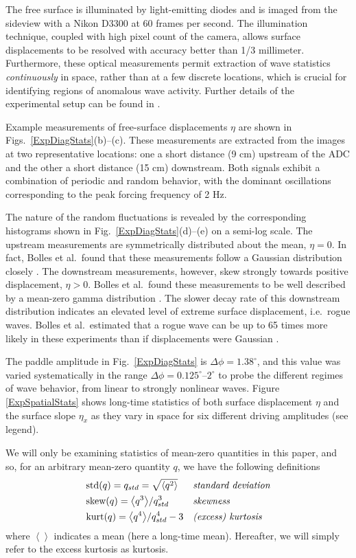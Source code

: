 \documentclass[11pt]{article}
\newcommand{\mean}[1]{\left< #1 \right>}
\newcommand{\skw}{\text{skew}}
\newcommand{\var}{\text{var}}
\newcommand{\kurt}{\text{kurt}}
\newcommand{\std}{\text{std}}
\newcommand{\Dphi}{\Delta \phi}
\begin{document}
	The free surface is illuminated by light-emitting diodes and is imaged from the sideview with a Nikon D3300 at 60 frames per second. The illumination technique, coupled with high pixel count of the camera, allows surface displacements to be resolved with accuracy better than 1/3 millimeter. Furthermore, these optical measurements permit extraction of wave statistics {\em continuously} in space, rather than at a few discrete locations, which is crucial for identifying regions of anomalous wave activity. Further details of the experimental setup can be found in \cite{bolles2019}.

	Example measurements of free-surface displacements $\eta$ are shown in Figs.~\ref{ExpDiagStats}(b)--(c). These measurements are extracted from the images at two representative locations: one a short distance (9 cm) upstream of the ADC and the other a short distance (15 cm) downstream. Both signals exhibit a combination of periodic and random behavior, with the dominant oscillations corresponding to the peak forcing frequency of 2 Hz. 
	
	The nature of the random fluctuations is revealed by the corresponding histograms shown in Fig.~\ref{ExpDiagStats}(d)--(e) on a semi-log scale. The upstream measurements are symmetrically distributed about the mean, $\eta = 0$. In fact, Bolles et al.~found that these measurements follow a Gaussian distribution closely \cite{bolles2019}. The downstream measurements, however, skew strongly towards positive displacement, $\eta > 0$. Bolles et al.~found these measurements to be well described by a mean-zero gamma distribution \cite{bolles2019}. The slower decay rate of this downstream distribution indicates an elevated level of extreme surface displacement, i.e.~rogue waves. Bolles et al.~estimated that a rogue wave can be up to 65 times more likely in these experiments than if displacements were Gaussian \cite{bolles2019}. 
 
	The paddle amplitude in Fig.~\ref{ExpDiagStats} is $\Dphi = 1.38^{\circ}$, and this value was varied systematically in the range $\Dphi = 0.125^{\circ}$--$2^{\circ}$ to probe the different regimes of wave behavior, from linear to strongly nonlinear waves. Figure \ref{ExpSpatialStats} shows long-time statistics of both surface displacement $\eta$ and the surface slope $\eta_x$ as they vary in space for six different driving amplitudes (see legend). 
		
	We will only be examining statistics of mean-zero quantities in this paper, and so, for an arbitrary mean-zero quantity $q$, we have the following definitions
\begin{align}
& \std(q) = q_{std}= \sqrt{\mean{q^2}}
&&\mbox{\em standard deviation} \\
& \skw(q) = {\mean{q^3}} / {q_{std}^3}	
&&\mbox{\em skewness} \\
& \kurt(q) = {\mean{q^4}} / {q_{std}^4} - 3
&&\mbox{\em (excess) kurtosis}
\end{align}
where $\mean{}$ indicates a mean (here a long-time mean). Hereafter, we will simply refer to the excess kurtosis as kurtosis.
\end{document}
